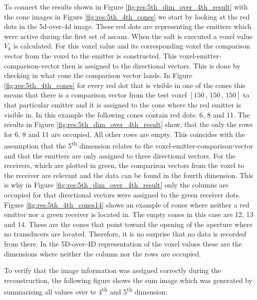 To connect the results shown in Figure \ref{fig:res:5th_dim_over_4th_result} with the cone images in Figure \ref{fig:res:5th_4th_cones} we start by looking at the red dots in the 5d-over-4d image. These red dots are representing the emitters which were active during the first set of \acp{ascan}. When the \ac{saft} is executed a voxel value $V_k$ is calculated. For this voxel value and its corresponding voxel the comparison vector from the voxel to the emitter is constructed. This voxel-emitter-comparison-vector then is assigned to the directional vectors. This is done by checking in what cone the comparison vector lands. In Figure \ref{fig:res:5th_4th_cones} for every red dot that is visible in one of the cones this means that there is a comparison vector from the test voxel $[150\, , \, 150\, , \, 150]$ to that particular emitter and it is assigned to the cone where the red emitter is visible in. In this example the following cones contain red dots: 6, 8 and 11. The results in Figure \ref{fig:res:5th_dim_over_4th_result} show, that the only the rows for 6, 8 and 11 are occupied. All other rows are empty. This coincides with the assumption that the 5\textsuperscript{th} dimension relates to the voxel-emitter-comparison-vector and that the emitters are only assigned to three directional vectors. 
For the receivers, which are plotted in green, the comparison vectors from the voxel to the receiver are relevant and the data can be found in the fourth dimension. This is why in Figure \ref{fig:res:5th_dim_over_4th_result} only the columns are occupied for that directional vectors were assigned to the green receiver dots. Figure \ref{fig:res:5th_4th_cones14} shows an example of cones where neither a red emitter nor a green receiver is located in. The empty cones in this case are 12, 13 and 14. These are the cones that point toward the opening of the aperture where no transducers are located. Therefore, it is no surprise that no data is recorded from there. In the 5D-over-4D representation of the voxel values these are the dimensions where neither the column nor the rows are occupied.

\bigskip

To verify that the image information was assigned correctly during the reconstruction, the following figure shows the sum image which was generated by summarising all values over te 4\textsuperscript{th} and 5\textsuperscript{th} dimension:



